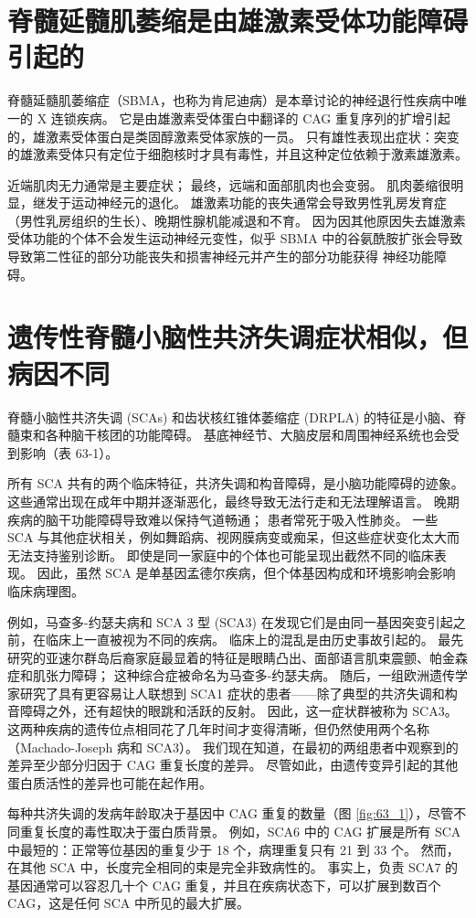\section{脊髓延髓肌萎缩是由雄激素受体功能障碍引起的}
脊髓延髓肌萎缩症（SBMA，也称为肯尼迪病）是本章讨论的神经退行性疾病中唯一的 X 连锁疾病。 它是由雄激素受体蛋白中翻译的 CAG 重复序列的扩增引起的，雄激素受体蛋白是类固醇激素受体家族的一员。 只有雄性表现出症状：突变的雄激素受体只有定位于细胞核时才具有毒性，并且这种定位依赖于激素雄激素。

近端肌肉无力通常是主要症状； 最终，远端和面部肌肉也会变弱。 肌肉萎缩很明显，继发于运动神经元的退化。 雄激素功能的丧失通常会导致男性乳房发育症（男性乳房组织的生长）、晚期性腺机能减退和不育。 因为因其他原因失去雄激素受体功能的个体不会发生运动神经元变性，似乎 SBMA 中的谷氨酰胺扩张会导致导致第二性征的部分功能丧失和损害神经元并产生的部分功能获得 神经功能障碍。

\section{遗传性脊髓小脑性共济失调症状相似，但病因不同}

脊髓小脑性共济失调 (SCAs) 和齿状核红锥体萎缩症 (DRPLA) 的特征是小脑、脊髓束和各种脑干核团的功能障碍。 基底神经节、大脑皮层和周围神经系统也会受到影响（表 63-1）。

所有 SCA 共有的两个临床特征，共济失调和构音障碍，是小脑功能障碍的迹象。 这些通常出现在成年中期并逐渐恶化，最终导致无法行走和无法理解语言。 晚期疾病的脑干功能障碍导致难以保持气道畅通； 患者常死于吸入性肺炎。 一些 SCA 与其他症状相关，例如舞蹈病、视网膜病变或痴呆，但这些症状变化太大而无法支持鉴别诊断。 即使是同一家庭中的个体也可能呈现出截然不同的临床表现。 因此，虽然 SCA 是单基因孟德尔疾病，但个体基因构成和环境影响会影响临床病理图。

例如，马查多-约瑟夫病和 SCA 3 型 (SCA3) 在发现它们是由同一基因突变引起之前，在临床上一直被视为不同的疾病。 临床上的混乱是由历史事故引起的。 最先研究的亚速尔群岛后裔家庭最显着的特征是眼睛凸出、面部语言肌束震颤、帕金森症和肌张力障碍； 这种综合症被命名为马查多-约瑟夫病。 随后，一组欧洲遗传学家研究了具有更容易让人联想到 SCA1 症状的患者——除了典型的共济失调和构音障碍之外，还有超快的眼跳和活跃的反射。 因此，这一症状群被称为 SCA3。 这两种疾病的遗传位点相同花了几年时间才变得清晰，但仍然使用两个名称（Machado-Joseph 病和 SCA3）。 我们现在知道，在最初的两组患者中观察到的差异至少部分归因于 CAG 重复长度的差异。 尽管如此，由遗传变异引起的其他蛋白质活性的差异也可能在起作用。

每种共济失调的发病年龄取决于基因中 CAG 重复的数量（图 \ref{fig:63_1}），尽管不同重复长度的毒性取决于蛋白质背景。 例如，SCA6 中的 CAG 扩展是所有 SCA 中最短的：正常等位基因的重复少于 18 个，病理重复只有 21 到 33 个。 然而，在其他 SCA 中，长度完全相同的束是完全非致病性的。 事实上，负责 SCA7 的基因通常可以容忍几十个 CAG 重复，并且在疾病状态下，可以扩展到数百个 CAG，这是任何 SCA 中所见的最大扩展。


